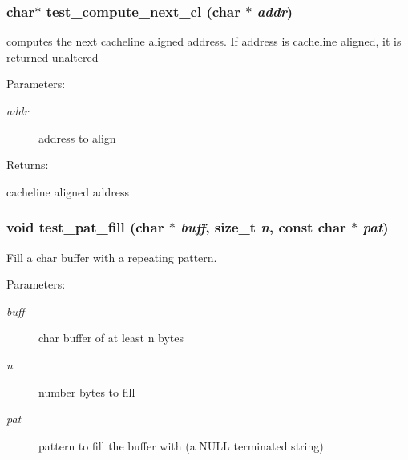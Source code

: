 \subsubsection{\setlength{\rightskip}{0pt plus 5cm}char$\ast$ test\_\-compute\_\-next\_\-cl (char $\ast$ {\em addr})}\label{group__test__comp_a2}


computes the next cacheline aligned address. If address is cacheline aligned, it is returned unaltered

\begin{Desc}
\item[Parameters: ]\par
\begin{description}
\item[{\em 
addr}]address to align \end{description}
\end{Desc}
\begin{Desc}
\item[Returns: ]\par
cacheline aligned address \end{Desc}
\subsubsection{\setlength{\rightskip}{0pt plus 5cm}void test\_\-pat\_\-fill (char $\ast$ {\em buff}, size\_\-t {\em n}, const char $\ast$ {\em pat})}\label{group__test__comp_a3}


Fill a char buffer with a repeating pattern.

\begin{Desc}
\item[Parameters: ]\par
\begin{description}
\item[{\em 
buff}]char buffer of at least n bytes \item[{\em 
n}]number bytes to fill \item[{\em 
pat}]pattern to fill the buffer with (a NULL terminated string) \end{description}
\end{Desc}
